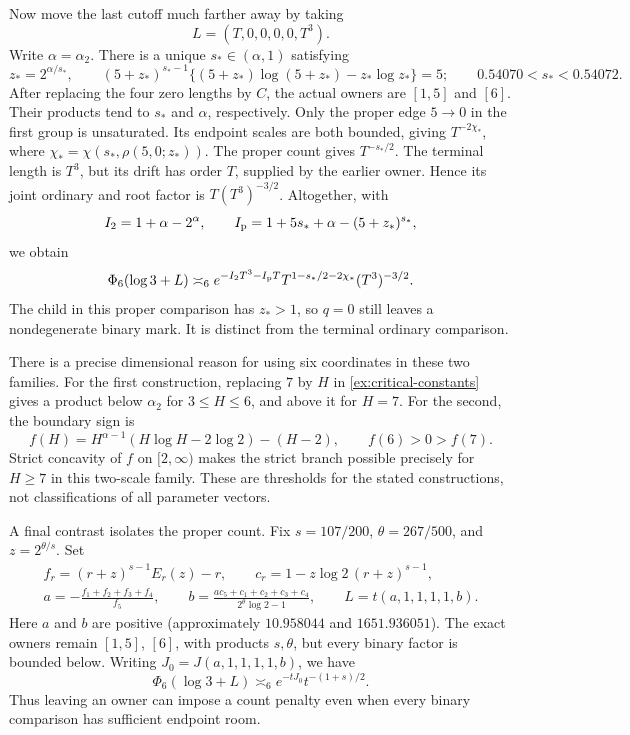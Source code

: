 Now move the last cutoff much farther away by taking
\begin{equation}
 L=(T,0,0,0,0,T^3).
 \label{ex:split-lengths}
\end{equation}
Write \(\alpha=\alpha_2\).  There is a unique \(s_*\in(\alpha,1)\)
satisfying
\begin{equation}
 z_*=2^{\alpha/s_*},\qquad
 (5+z_*)^{s_*-1}
 \{(5+z_*)\log(5+z_*)-z_*\log z_*\}=5;
 \qquad 0.54070<s_*<0.54072.
 \label{ex:split-root}
\end{equation}
After replacing the four zero lengths by \(C\), the actual owners are
\([1,5]\) and \([6]\).  Their products tend to \(s_*\) and \(\alpha\),
respectively.  Only the proper edge \(5\to0\) in the first group is
unsaturated.  Its endpoint scales are both bounded, giving
\(T^{-2\chi_*}\), where
\(\chi_*=\chi(s_*,\rho(5,0;z_*))\).  The proper count gives
\(T^{-s_*/2}\).  The terminal length is \(T^3\), but its drift has order
\(T\), supplied by the earlier owner.  Hence its joint ordinary and root
factor is \(T(T^3)^{-3/2}\).  Altogether, with
\[
 I_2=1+\alpha-2^\alpha,\qquad
 I_{\rm p}=1+5s_*+\alpha-(5+z_*)^{s_*},
\]
we obtain
\begin{equation}
 \Phi_6(\log3+L)\asymp_6
 e^{-I_2T^3-I_{\rm p}T}
 T^{1-s_*/2-2\chi_*}(T^3)^{-3/2}.
 \label{ex:split-answer}
\end{equation}
The child in this proper comparison has \(z_*>1\), so \(q=0\) still
leaves a nondegenerate binary mark.  It is distinct from the terminal
ordinary comparison.

There is a precise dimensional reason for using six coordinates in
these two families.  For the first construction, replacing \(7\) by
\(H\) in \eqref{ex:critical-constants} gives a product below
\(\alpha_2\) for \(3\le H\le6\), and above it for \(H=7\).  For the
second, the boundary sign is
\[
 f(H)=H^{\alpha-1}(H\log H-2\log2)-(H-2),\qquad
 f(6)>0>f(7).
\]
Strict concavity of \(f\) on \([2,\infty)\) makes the strict branch
possible precisely for \(H\ge7\) in this two-scale family.  These are
thresholds for the stated constructions, not classifications of all
parameter vectors.

A final contrast isolates the proper count.  Fix
\(s=107/200\), \(\theta=267/500\), and \(z=2^{\theta/s}\).  Set
\begin{gather}
 f_r=(r+z)^{s-1}E_r(z)-r,\qquad
 c_r=1-z\log2\,(r+z)^{s-1},\nonumber\\
 a=-\frac{f_1+f_2+f_3+f_4}{f_5},\qquad
 b=\frac{ac_5+c_1+c_2+c_3+c_4}{2^\theta\log2-1},\qquad
 L=t(a,1,1,1,1,b).
 \label{ex:ray-lengths}
\end{gather}
Here \(a\) and \(b\) are positive (approximately \(10.958044\) and
\(1651.936051\)).  The exact owners remain \([1,5]\), \([6]\), with
products \(s,\theta\), but every binary factor is bounded below.
Writing \(J_0=J(a,1,1,1,1,b)\), we have
\begin{equation}
 \Phi_6(\log3+L)\asymp_6 e^{-tJ_0}t^{-(1+s)/2}.
 \label{ex:ray-answer}
\end{equation}
Thus leaving an owner can impose a count penalty even when every binary
comparison has sufficient endpoint room.

